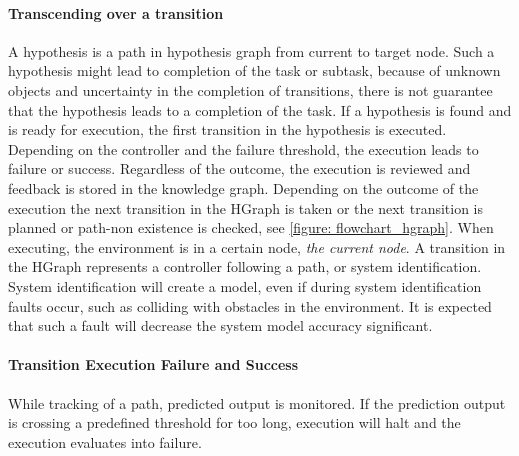 \paragraph{Transcending over a transition}
A hypothesis is a path in hypothesis graph from current to target node. Such a hypothesis might lead to completion of the task or subtask, because of unknown objects and uncertainty in the completion of transitions, there is not guarantee that the hypothesis leads to a completion of the task. If a hypothesis is found and is ready for execution, the first transition in the hypothesis is executed. Depending on the controller and the failure threshold, the execution leads to failure or success. Regardless of the outcome, the execution is reviewed and feedback is stored in the knowledge graph. Depending on the outcome of the execution the next transition in the HGraph is taken or the next transition is planned or path-non existence is checked, see \cref{figure: flowchart_hgraph}. When executing, the environment is in a certain node,  \textit{the current node}. A transition in the HGraph represents a controller following a path, or system identification. System identification will create a model, even if during system identification faults occur, such as colliding with obstacles in the environment. It is expected that such a fault will decrease the system model accuracy significant.\\

\paragraph{Transition Execution Failure and Success}
While tracking of a path, predicted output is monitored. If the prediction output is crossing a predefined threshold for too long, execution will halt and the execution evaluates into failure.\\

